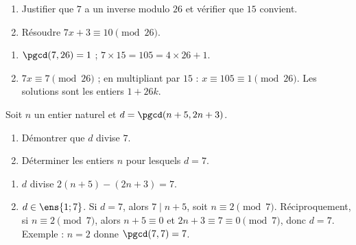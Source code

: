 \begin{exercise}
\begin{enumerate}
\item Justifier que $7$ a un inverse modulo $26$ et vérifier que $15$ convient.
\item Résoudre $7x+3\equiv10\pmod{26}$.
\end{enumerate}
\end{exercise}
\begin{solution}
\begin{enumerate}
\item $\pgcd(7,26)=1$ ; $7\times15=105=4\times26+1$.
\item $7x\equiv7\pmod{26}$ ; en multipliant par $15$ : $x\equiv105\equiv1\pmod{26}$. Les solutions sont les entiers $1+26k$.
\end{enumerate}
\end{solution}

\begin{exercise}
Soit $n$ un entier naturel et $d=\pgcd(n+5,2n+3)$.
\begin{enumerate}
\item Démontrer que $d$ divise $7$.
\item Déterminer les entiers $n$ pour lesquels $d=7$.
\end{enumerate}
\end{exercise}
\begin{solution}
\begin{enumerate}
\item $d$ divise $2(n+5)-(2n+3)=7$.
\item $d\in\ens{1;7}$. Si $d=7$, alors $7\mid n+5$, soit $n\equiv2\pmod7$. Réciproquement, si $n\equiv2\pmod7$, alors $n+5\equiv0$ et $2n+3\equiv7\equiv0\pmod7$, donc $d=7$. Exemple : $n=2$ donne $\pgcd(7,7)=7$.
\end{enumerate}
\end{solution}

\mxnewpage
